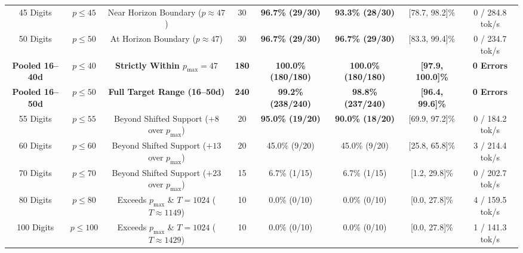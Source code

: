 \documentclass[10pt,twocolumn]{article}
\begin{document}
\begin{table}[t]
{\begin{tabular}{@{}cccccccc@{}}
\midrule
45 Digits & $p \le 45$ & Near Horizon Boundary ($p \approx 47$) & 30 & \textbf{96.7\% (29/30)} & \textbf{93.3\% (28/30)} & [78.7, 98.2]\% & 0 / 284.8 tok/s \\
50 Digits & $p \le 50$ & At Horizon Boundary ($p \approx 47$) & 30 & \textbf{96.7\% (29/30)} & \textbf{96.7\% (29/30)} & [83.3, 99.4]\% & 0 / 234.7 tok/s \\
\midrule
\textbf{Pooled 16--40d} & $p \le 40$ & \textbf{Strictly Within $p_{\max}=47$} & \textbf{180} & \textbf{100.0\% (180/180)} & \textbf{100.0\% (180/180)} & \textbf{[97.9, 100.0]\%} & \textbf{0 Errors} \\
\textbf{Pooled 16--50d} & $p \le 50$ & \textbf{Full Target Range (16--50d)} & \textbf{240} & \textbf{99.2\% (238/240)} & \textbf{98.8\% (237/240)} & \textbf{[96.4, 99.6]\%} & \textbf{0 Errors} \\
\midrule
55 Digits & $p \le 55$ & Beyond Shifted Support ($+8$ over $p_{\max}$) & 20 & \textbf{95.0\% (19/20)} & \textbf{90.0\% (18/20)} & [69.9, 97.2]\% & 0 / 184.2 tok/s \\
60 Digits & $p \le 60$ & Beyond Shifted Support ($+13$ over $p_{\max}$) & 20 & 45.0\% (9/20) & 45.0\% (9/20) & [25.8, 65.8]\% & 3 / 214.4 tok/s \\
70 Digits & $p \le 70$ & Beyond Shifted Support ($+23$ over $p_{\max}$) & 15 & 6.7\% (1/15) & 6.7\% (1/15) & [1.2, 29.8]\% & 0 / 202.7 tok/s \\
80 Digits & $p \le 80$ & Exceeds $p_{\max}$ \& $T=1024$ ($T \approx 1149$) & 10 & 0.0\% (0/10) & 0.0\% (0/10) & [0.0, 27.8]\% & 4 / 159.5 tok/s \\
100 Digits & $p \le 100$ & Exceeds $p_{\max}$ \& $T=1024$ ($T \approx 1429$) & 10 & 0.0\% (0/10) & 0.0\% (0/10) & [0.0, 27.8]\% & 1 / 141.3 tok/s \\
\bottomrule
\end{tabular}%
}
\end{table}
\end{document}
